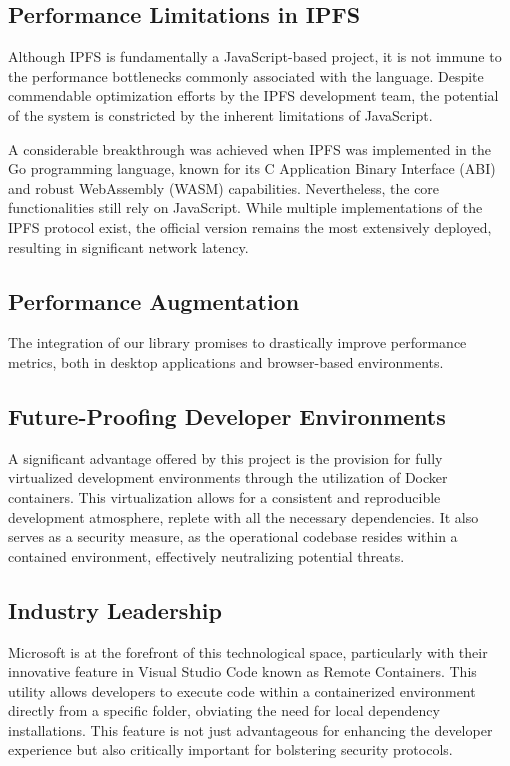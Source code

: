 \documentclass[10pt,journal,compsoc]{IEEEtran}
\begin{document}
\subsection{Performance Limitations in IPFS}

Although IPFS is fundamentally a JavaScript-based project, it is not immune to the performance bottlenecks commonly associated with the language. Despite commendable optimization efforts by the IPFS development team, the potential of the system is constricted by the inherent limitations of JavaScript.

A considerable breakthrough was achieved when IPFS was implemented in the Go programming language, known for its C Application Binary Interface (ABI) and robust WebAssembly (WASM) capabilities. Nevertheless, the core functionalities still rely on JavaScript. While multiple implementations of the IPFS protocol exist, the official version remains the most extensively deployed, resulting in significant network latency.

\subsection{Performance Augmentation}

The integration of our library promises to drastically improve performance metrics, both in desktop applications and browser-based environments.

\subsection{Future-Proofing Developer Environments}

A significant advantage offered by this project is the provision for fully virtualized development environments through the utilization of Docker containers. This virtualization allows for a consistent and reproducible development atmosphere, replete with all the necessary dependencies. It also serves as a security measure, as the operational codebase resides within a contained environment, effectively neutralizing potential threats.

\subsection{Industry Leadership}

Microsoft is at the forefront of this technological space, particularly with their innovative feature in Visual Studio Code known as Remote Containers. This utility allows developers to execute code within a containerized environment directly from a specific folder, obviating the need for local dependency installations. This feature is not just advantageous for enhancing the developer experience but also critically important for bolstering security protocols.
\end{document}
